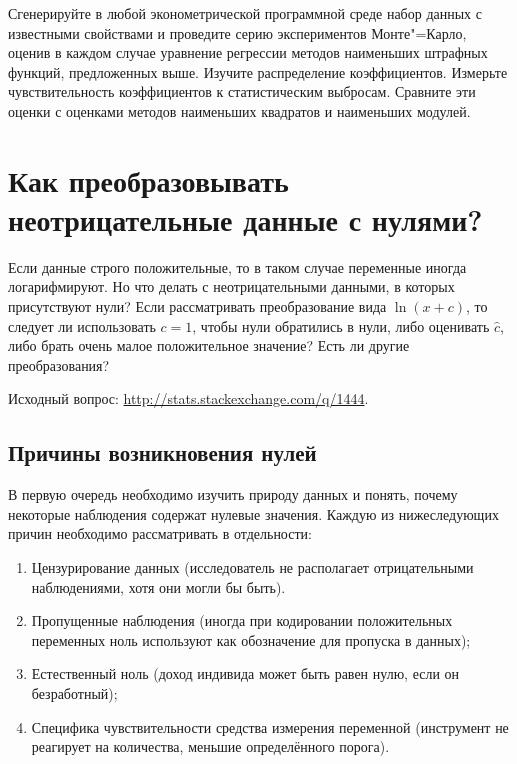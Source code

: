 \documentclass[11pt]{article}
\begin{document}
Сгенерируйте в любой эконометрической программной среде набор данных с известными свойствами и проведите серию экспериментов Монте"=Карло, оценив в каждом случае уравнение регрессии методов наименьших штрафных функций, предложенных выше. Изучите распределение коэффициентов. Измерьте чувствительность коэффициентов к статистическим выбросам. Сравните эти оценки с оценками методов наименьших квадратов и наименьших модулей.

\section{Как преобразовывать неотрицательные данные с нулями? }

Если данные строго положительные, то в таком случае переменные иногда логарифмируют. Но что делать с неотрицательными данными, в которых присутствуют нули? Если рассматривать преобразование вида $\ln (x+c)$, то следует ли использовать $c=1$, чтобы нули обратились в нули, либо оценивать $\hat c$, либо брать очень малое положительное значение? Есть ли другие преобразования?

Исходный вопрос: \url{http://stats.stackexchange.com/q/1444}.

\subsection{Причины возникновения нулей}

В первую очередь необходимо изучить природу данных и понять, почему некоторые наблюдения содержат нулевые значения. Каждую из нижеследующих причин необходимо рассматривать в отдельности:
\begin{enumerate}
	\item Цензурирование данных (исследователь не располагает отрицательными наблюдениями, хотя они могли бы быть). 
	\item Пропущенные наблюдения (иногда при кодировании положительных переменных ноль используют как обозначение для пропуска в данных);
	\item Естественный ноль (доход индивида может быть равен нулю, если он безработный);
	\item Специфика чувствительности средства измерения переменной (инструмент не реагирует на количества, меньшие определённого порога). 
\end{enumerate}

\end{document}
